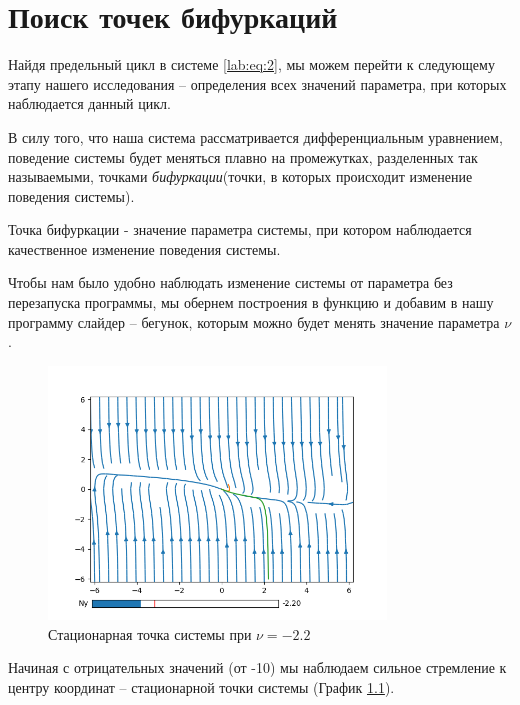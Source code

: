 \chapter{Поиск точек бифуркаций}

Найдя предельный цикл в системе \ref{lab:eq:2}, мы можем перейти к следующему
этапу нашего исследования -- определения всех значений параметра, при которых
наблюдается данный цикл.

В силу того, что наша система рассматривается дифференциальным уравнением,
поведение системы будет меняться плавно на промежутках, разделенных так
называемыми, точками \textit{бифуркации}(точки, в которых происходит изменение
поведения системы).

\begin{definition}
    Точка бифуркации - значение параметра системы, при котором наблюдается
    качественное изменение поведения системы.
\end{definition}

Чтобы нам было удобно наблюдать изменение системы от параметра без перезапуска
программы, мы обернем построения в функцию и добавим в нашу программу слайдер --
бегунок, которым можно будет менять значение параметра $\nu$.

\begin{figure}
    \centering
    \includegraphics[width=0.8\textwidth]{figures/2_point_-2_2}
    \caption{Стационарная точка системы при $\nu = -2.2$}
    \label{lab2:point_-2}
\end{figure}

Начиная с отрицательных значений (от -10) мы наблюдаем сильное стремление
к центру координат -- стационарной точки системы (График \ref{lab2:point_-2}).

